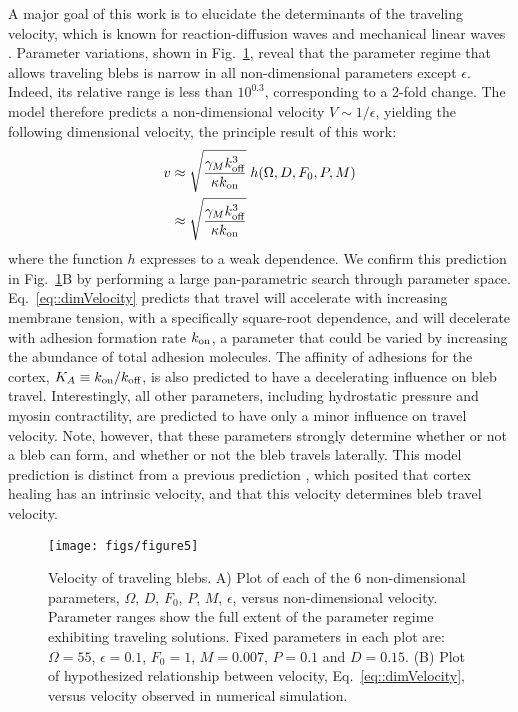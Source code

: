 A major goal of this work is to elucidate the determinants of the traveling velocity, which is known for reaction-diffusion waves and mechanical linear waves \cite{Allard:2012if}. Parameter variations, shown in Fig.~\ref{fig::velocity}, reveal that the parameter regime that allows traveling blebs is narrow in all non-dimensional parameters except $\epsilon$. Indeed, its relative range is less than $10^{0.3}$, corresponding to a 2-fold change. The model therefore predicts a non-dimensional velocity $V\sim 1/\epsilon$, yielding the following dimensional velocity, the principle result of this work:  
\begin{align}
v &\approx \sqrt{\frac{\gamma_M k_{\mbox{\scriptsize off}}^3}{\kappa k_{\mbox{\scriptsize on}}}}\; h(\Omega,D,F_0,P,M)\\
 &\approx \sqrt{\frac{\gamma_M k_{\mbox{\scriptsize off}}^3}{\kappa k_{\mbox{\scriptsize on}}}} \label{eq::dimVelocity}
\end{align}
where the function $h$ expresses to a weak dependence. We confirm this prediction in Fig.~\ref{fig::velocity}B by performing a large pan-parametric search through parameter space. 
Eq.~\ref{eq::dimVelocity} predicts that travel will accelerate with increasing membrane tension, with a specifically square-root dependence, and will decelerate with adhesion formation rate $k_{\mbox{\scriptsize on}}$, a parameter that could be varied by increasing the abundance of total adhesion molecules. The affinity of adhesions for the cortex, $K_A\equiv k_{\mbox{\scriptsize on}}/k_{\mbox{\scriptsize off}}$, is also predicted to have a decelerating influence on bleb travel. Interestingly, all other parameters, including hydrostatic pressure and myosin contractility, are predicted to have only a minor influence on travel velocity. Note, however, that these parameters strongly determine whether or not a bleb can form, and whether or not the bleb travels laterally. This model prediction is distinct from a previous prediction \cite{Lim:2012fz}, which posited that cortex healing has an intrinsic velocity, and that this velocity determines bleb travel velocity.  



\begin{figure}
   \begin{center}
   \captionsetup{width=17cm}
     \texttt{[image: figs/figure5]}
      \caption{Velocity of traveling blebs. A) Plot of each of the 6 non-dimensional parameters, $\Omega$, $D$, $F_0$, $P$, $M$, $\epsilon$, versus non-dimensional velocity. Parameter ranges show the full extent of the parameter regime exhibiting traveling solutions. Fixed parameters in each plot are: $\Omega = 55$, $\epsilon = 0.1$, $F_0 = 1$, $M = 0.007$, $P = 0.1$ and $D = 0.15$. (B) Plot of hypothesized relationship between velocity, Eq.~\ref{eq::dimVelocity}, versus velocity observed in numerical simulation.}
      \label{fig::velocity}
   \end{center}
\end{figure}

